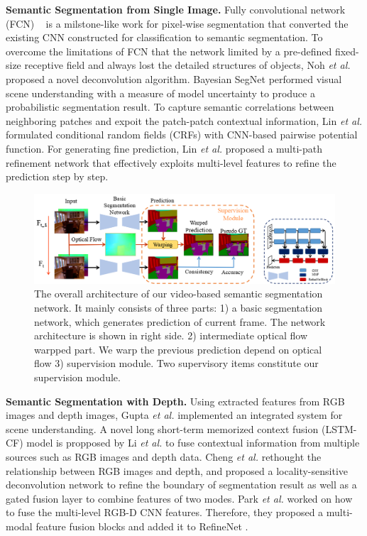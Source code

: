 {\bf Semantic Segmentation from Single Image.}
%
Fully convolutional network (FCN) ~\cite{Long2015} is a milstone-like work for pixel-wise segmentation that converted the existing CNN constructed for classification to semantic segmentation.
%
To overcome the limitations of FCN that the network limited by a pre-defined fixed-size receptive field and always lost the detailed structures of objects, Noh \emph{et al.} \cite{Noh2015} proposed a novel deconvolution algorithm. 
%
Bayesian SegNet \cite{Kendall2015} performed visual scene understanding with a measure of model uncertainty to produce a probabilistic segmentation result.
%
To capture semantic correlations between neighboring patches and expoit the
patch-patch contextual information, Lin \emph{et al.} \cite{Lin2016} formulated conditional random fields (CRFs) with CNN-based pairwise potential function. 
%
For generating fine prediction, Lin \emph{et al.} \cite{Lin2017} proposed a multi-path refinement network that effectively exploits multi-level features to refine the prediction step by step.

\begin{figure}[htbp]
	\vspace{-0.6cm}
	\centering
	\includegraphics[scale=0.6]{figure/Pipeline.png}
	\caption{The overall architecture of our video-based semantic segmentation network. It mainly consists of three parts: 1) a basic segmentation network, which generates prediction of current frame. The network architecture is shown in right side. 2) intermediate optical flow warpped part. We warp the previous prediction depend on optical flow 3) supervision module. Two supervisory items constitute our supervision module.}
	\label{fig:Pipeline}
\end{figure}

{\bf Semantic Segmentation with Depth.}
%
Using extracted features from RGB images and depth images, Gupta \emph{et al.} \cite{Gupta2014} implemented an integrated system for scene understanding.
%
 A novel long short-term memorized context fusion (LSTM-CF) model is propposed by Li \emph{et al.} \cite{Li2016} to fuse contextual information from multiple sources such as RGB images and depth data.
% 
Cheng \emph{et al.} \cite{Cheng2017} rethought the relationship between RGB images and depth, and proposed a locality-sensitive deconvolution network to refine the boundary of segmentation result as well as a gated fusion layer to combine features of two modes.
%
Park \emph{et al.} \cite{Park2017} worked on how to fuse the multi-level RGB-D CNN features.
%
Therefore, they proposed a multi-modal feature fusion blocks and added it to RefineNet \cite{Lin2017}.


